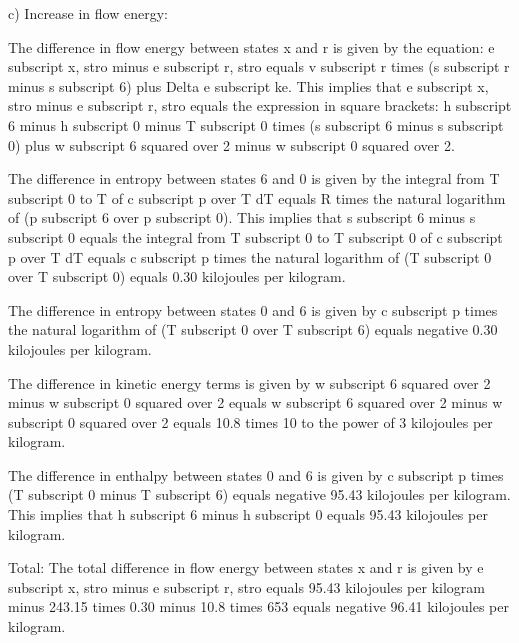 c) Increase in flow energy:

The difference in flow energy between states x and r is given by the equation:
e subscript x, stro minus e subscript r, stro equals v subscript r times (s subscript r minus s subscript 6) plus Delta e subscript ke. This implies that e subscript x, stro minus e subscript r, stro equals the expression in square brackets: h subscript 6 minus h subscript 0 minus T subscript 0 times (s subscript 6 minus s subscript 0) plus w subscript 6 squared over 2 minus w subscript 0 squared over 2.

The difference in entropy between states 6 and 0 is given by the integral from T subscript 0 to T of c subscript p over T dT equals R times the natural logarithm of (p subscript 6 over p subscript 0). This implies that s subscript 6 minus s subscript 0 equals the integral from T subscript 0 to T subscript 0 of c subscript p over T dT equals c subscript p times the natural logarithm of (T subscript 0 over T subscript 0) equals 0.30 kilojoules per kilogram.

The difference in entropy between states 0 and 6 is given by c subscript p times the natural logarithm of (T subscript 0 over T subscript 6) equals negative 0.30 kilojoules per kilogram.

The difference in kinetic energy terms is given by w subscript 6 squared over 2 minus w subscript 0 squared over 2 equals w subscript 6 squared over 2 minus w subscript 0 squared over 2 equals 10.8 times 10 to the power of 3 kilojoules per kilogram.

The difference in enthalpy between states 0 and 6 is given by c subscript p times (T subscript 0 minus T subscript 6) equals negative 95.43 kilojoules per kilogram. This implies that h subscript 6 minus h subscript 0 equals 95.43 kilojoules per kilogram.

Total: The total difference in flow energy between states x and r is given by e subscript x, stro minus e subscript r, stro equals 95.43 kilojoules per kilogram minus 243.15 times 0.30 minus 10.8 times 653 equals negative 96.41 kilojoules per kilogram.